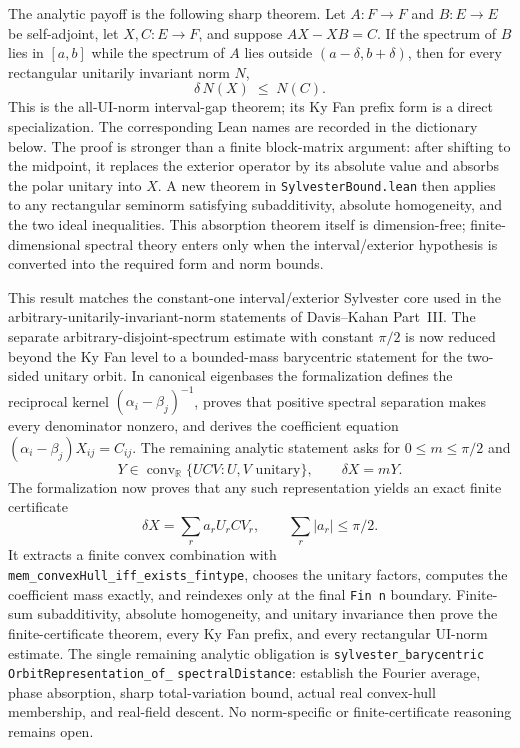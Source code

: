 \documentclass[11pt]{article}
\theoremstyle{remark}
\begin{document}
The analytic payoff is the following sharp theorem.  Let
$A:F\to F$ and $B:E\to E$ be self-adjoint, let $X,C:E\to F$, and suppose
$AX-XB=C$.  If the spectrum of $B$ lies in $[a,b]$ while the spectrum of $A$
lies outside $(a-\delta,b+\delta)$, then for every rectangular unitarily
invariant norm $N$,
\[
  \delta\,N(X)\;\le\;N(C).
\]
This is the all-UI-norm interval-gap theorem; its Ky Fan prefix form is a
direct specialization.  The corresponding Lean names are recorded in the
dictionary below.  The proof is stronger
than a finite block-matrix argument: after shifting to the midpoint, it replaces
the exterior operator by its absolute value and absorbs the polar unitary into
$X$.  A new theorem in \texttt{SylvesterBound.lean} then applies to any
rectangular seminorm satisfying subadditivity, absolute homogeneity, and the
two ideal inequalities.  This absorption theorem itself is dimension-free;
finite-dimensional spectral theory enters only when the interval/exterior
hypothesis is converted into the required form and norm bounds.

This result matches the constant-one interval/exterior Sylvester core used in
the arbitrary-unitarily-invariant-norm statements of Davis--Kahan Part~III.
The separate arbitrary-disjoint-spectrum estimate with constant $\pi/2$ is
now reduced beyond the Ky Fan level to a bounded-mass barycentric statement for
the two-sided unitary orbit.  In canonical eigenbases the formalization defines
the reciprocal kernel $(\alpha_i-\beta_j)^{-1}$, proves that positive spectral
separation makes every denominator nonzero, and derives the coefficient
equation $(\alpha_i-\beta_j)X_{ij}=C_{ij}$.  The remaining analytic statement
asks for $0\le m\le\pi/2$ and
\[
  Y\in\operatorname{conv}_{\mathbb R}\{UCV:U,V\text{ unitary}\},
  \qquad \delta X=mY.
\]
The formalization now proves that any such representation yields an exact
finite certificate
\[
  \delta X=\sum_r a_r U_r C V_r,
  \qquad \sum_r |a_r|\le \pi/2.
\]
It extracts a finite convex combination with
\texttt{mem\_convexHull\_iff\_}\allowbreak\texttt{exists\_fintype}, chooses the unitary factors,
computes the coefficient mass exactly, and reindexes only at the final
\texttt{Fin~n} boundary.  Finite-sum subadditivity, absolute homogeneity, and
unitary invariance then prove the finite-certificate theorem, every Ky Fan
prefix, and every rectangular UI-norm estimate.  The single remaining analytic
obligation is
\texttt{sylvester\_barycentric}\allowbreak
\texttt{OrbitRepresentation\_of\_}\allowbreak
\texttt{spectralDistance}: establish the Fourier average, phase absorption,
sharp total-variation bound, actual real convex-hull membership, and real-field
descent.  No norm-specific or finite-certificate reasoning remains open.
\end{document}
